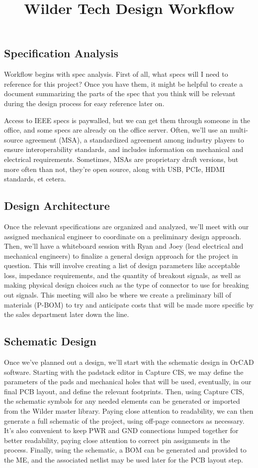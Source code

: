 \documentclass{article}
\title{Wilder Tech Design Workflow}
\author{}
\date{}
\begin{document}
\maketitle
\setcounter{section}{1}
\subsection{Specification Analysis}
Workflow begins with spec analysis. First of all, what specs will I need to reference for this project? Once you have them, it might be helpful to create a document summarizing the parts of the spec that you think will be relevant during the design process for easy reference later on. 

Access to IEEE specs is paywalled, but we can get them through someone in the office, and some specs are already on the office server. Often, we'll use an multi-source agreement (MSA), a standardized agreement among industry players to ensure interoperability standards, and includes information on mechanical and electrical requirements. Sometimes, MSAs are proprietary draft versions, but more often than not, they're open source, along with USB, PCIe, HDMI standards, et cetera.

\subsection{Design Architecture}
Once the relevant specifications are organized and analyzed, we'll meet with our assigned mechanical engineer to coordinate on a preliminary design approach. Then, we'll have a whiteboard session with Ryan and Joey (lead electrical and mechanical engineers) to finalize a general design approach for the project in question. This will involve creating a list of design parameters like acceptable loss, impedance requirements, and the quantity of breakout signals, as well as making physical design choices such as the type of connector to use for breaking out signals. This meeting will also be where we create a preliminary bill of materials (P-BOM) to try and anticipate costs that will be made more specific by the sales department later down the line. 

\subsection{Schematic Design}
Once we've planned out a design, we'll start with the schematic design in OrCAD software. Starting with the padstack editor in Capture CIS, we may define the parameters of the pads and mechanical holes that will be used, eventually, in our final PCB layout, and define the relevant footprints. Then, using Capture CIS, the schematic symbols for any needed elements can be generated or imported from the Wilder master library. Paying close attention to readability, we can then generate a full schematic of the project, using off-page connectors as necessary. It's also convenient to keep PWR and GND connections lumped together for better readability, paying close attention to correct pin assignments in the process. Finally, using the schematic, a BOM can be generated and provided to the ME, and the associated netlist may be used later for the PCB layout step.
\end{document}
